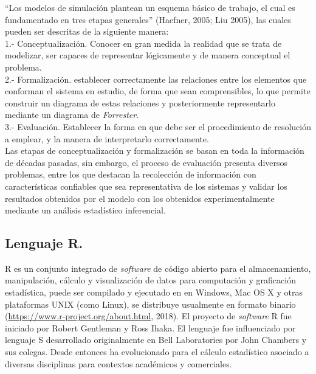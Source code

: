 ``Los modelos de simulaci\'on plantean un esquema b\'asico de trabajo, el cual es fundamentado en tres etapas generales'' (Haefner, 2005; Liu 2005), las cuales pueden ser descritas de la siguiente manera:\\

1.- Conceptualizaci\'on. Conocer en gran medida la realidad que se trata de modelizar, ser capaces de representar l\'ogicamente y de manera conceptual el problema. \\

2.- Formalizaci\'on. establecer correctamente las relaciones entre los elementos que conforman el sistema en estudio, de forma que sean comprensibles, lo que permite construir un diagrama de estas relaciones y posteriormente representarlo mediante un diagrama de \textit{Forrester}.\\

3.- Evaluaci\'on. Establecer la forma en que debe ser el procedimiento de resoluci\'on a emplear, y la manera de interpretarlo correctamente.\\


Las etapas de conceptualizaci\'on y formalizaci\'on se basan en toda la informaci\'on de d\'ecadas pasadas, sin embargo, el proceso de evaluaci\'on presenta diversos problemas, entre los que destacan la recolecci\'on de informaci\'on con caracter\'isticas confiables que sea representativa de los sistemas y validar los resultados obtenidos por el modelo con los obtenidos experimentalmente mediante un an\'alisis estad\'istico inferencial.


\subsection{Lenguaje R.}

R es un conjunto  integrado de \textit{software} de c\'odigo abierto para el almacenamiento, manipulaci\'on, c\'alculo y visualizaci\'on de datos para computaci\'on y graficaci\'on estad\'istica, puede ser compilado y ejecutado en  en Windows, Mac OS X y otras  plataformas UNIX (como Linux), se distribuye usualmente en formato binario (\url{https://www.r-project.org/about.html}, 2018). El proyecto de \emph{software} R fue iniciado por Robert Gentleman y Ross Ihaka. El lenguaje fue influenciado por  lenguaje S desarrollado originalmente en Bell Laboratories por John Chambers y sus colegas. Desde entonces ha evolucionado  para el c\'alculo estad\'istico asociado a diversas disciplinas para contextos acad\'emicos y comerciales. \\

